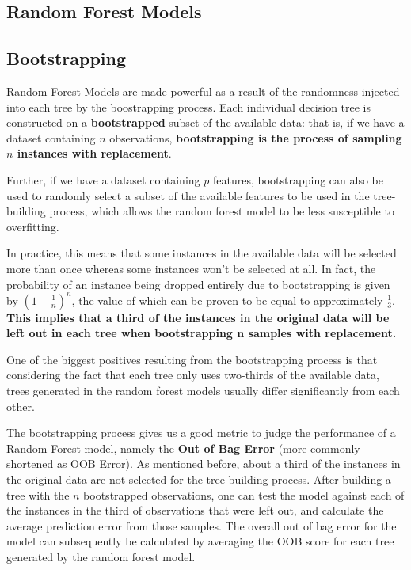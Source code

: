 \graphicspath{{images/}}

\begin{appendices}
  \section{Random Forest Models}

  \subsection{Bootstrapping} \label{app:sec:bootstrapping}

  Random Forest Models are made powerful as a result of the randomness injected into each tree by the boostrapping process.
  Each individual decision tree is constructed on a \textbf{bootstrapped} subset of the available data: that is, if we have a dataset containing $n$ observations,
  \textbf{bootstrapping is the process of sampling $n$ instances with replacement}.

  Further, if we have a dataset containing $p$ features, bootstrapping can also be used to randomly select a subset of the available features to be used in the tree-building process, which allows the random forest model to be less susceptible to overfitting.

  In practice, this means that some instances in the available data will be selected more than once whereas some instances won't be selected at all. In fact, the probability of an instance being dropped entirely due to bootstrapping is given by $ (1- \frac{1}{n})^n$, the value of which can be proven to be equal to approximately $\frac{1}{3}$.
  \textbf{This implies that a third of the instances in the original data will be left out in each tree when bootstrapping n samples with replacement.}

  One of the biggest positives resulting from the bootstrapping process is that considering the fact that each tree only uses two-thirds of the available data, trees generated in the random forest models usually differ significantly from each other.

  The bootstrapping process gives us a good metric to judge the performance of a Random Forest model, namely the \textbf{Out of Bag Error} (more commonly shortened as OOB Error).
  As mentioned before, about a third of the instances in the original data are not selected for the tree-building process.
  After building a tree with the $n$ bootstrapped observations, one can test the model against each of the instances in the third of observations that were left out, and calculate the average prediction error from those samples. The overall out of bag error for the model can subsequently be calculated by averaging the OOB score for each tree generated by the random forest model.


\end{appendices}
